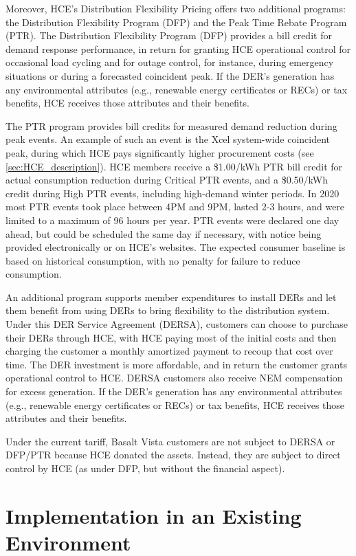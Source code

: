 \documentclass[12pt]{article}{Definitions/mdpi}
\begin{document}
Moreover, HCE's Distribution Flexibility Pricing offers two additional programs: the Distribution Flexibility Program (DFP) and the Peak Time Rebate Program (PTR). The Distribution Flexibility Program (DFP) provides a bill credit for demand response performance, in return for granting HCE operational control for occasional load cycling and for outage control, for instance, during emergency situations or during a forecasted coincident peak. If the DER's generation has any environmental attributes (e.g., renewable energy certificates or RECs) or tax benefits, HCE receives those attributes and their benefits.

The PTR program provides bill credits for measured demand reduction during peak events. An example of such an event is the Xcel system-wide coincident peak, during which HCE pays significantly higher procurement costs (see \cref{sec:HCE_description}). HCE members receive a \$1.00/kWh PTR bill credit for actual consumption reduction during Critical PTR events, and a \$0.50/kWh credit during High PTR events, including high-demand winter periods. In 2020 most PTR events took place between 4PM and 9PM, lasted 2-3 hours, and were limited to a maximum of 96 hours per year. PTR events were declared one day ahead, but could be scheduled the same day if necessary, with notice being provided electronically or on HCE's websites. The expected consumer baseline is based on historical consumption, with no penalty for failure to reduce consumption.

An additional program supports member expenditures to install DERs and let them benefit from using DERs to bring flexibility to the distribution system. Under this DER Service Agreement (DERSA), customers can choose to purchase their DERs through HCE, with HCE paying most of the initial costs and then charging the customer a monthly amortized payment to recoup that cost over time. The DER investment is more affordable, and in return the customer grants operational control to HCE. DERSA customers also receive NEM compensation for excess generation. If the DER's generation has any environmental attributes (e.g., renewable energy certificates or RECs) or tax benefits, HCE receives those attributes and their benefits. 

Under the current tariff, Basalt Vista customers are not subject to DERSA or DFP/PTR because HCE donated the assets. Instead, they are subject to direct control by HCE (as under DFP, but without the financial aspect). 


\section{Implementation in an Existing Environment}\label{sec:challenges}
\end{document}
